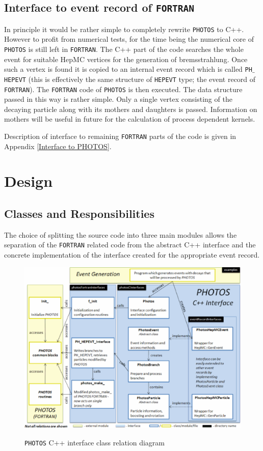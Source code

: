 \documentclass[]{Photos_interface_design}
\begin{document}
\subsection{Interface to event record of {\tt FORTRAN}}
\label{sect:F77fill}

In principle it would be rather simple to completely rewrite {\tt PHOTOS} to
C++. However to profit from numerical tests, for the time being the numerical core of {\tt PHOTOS}
is still left in {\tt FORTRAN}. The C++ part of the code searches the whole event for
suitable HepMC vertices for the generation of bremsstrahlung. Once such
a vertex is found it is copied to an internal event record  which is 
called  {\tt PH$\_$HEPEVT} (this is effectively the same structure of {\tt HEPEVT} type;
the event record of {\tt FORTRAN}).
The {\tt FORTRAN} code of {\tt PHOTOS} is then executed.
The data structure passed in this way is rather simple. Only a single vertex consisting
of the decaying particle along with its mothers and daughters is passed. Information 
on mothers will be useful in future for the calculation of process dependent 
kernels.



Description of interface to remaining {\tt FORTRAN} parts of the code is
given in  Appendix \ref{Interface to PHOTOS}.


\section{Design}
\label{sec:design}
\subsection{Classes and Responsibilities}

The choice of splitting the source code into three main modules
 allows the separation of the {\tt FORTRAN} related code from the abstract C++ interface
and the concrete implementation of the interface created for the appropriate
event record.

\begin{figure}[h!]
\centering
\includegraphics[scale=0.6]{interface_design.eps}
\label{fig:design}
\caption{{\tt PHOTOS} C++ interface class relation diagram}
\end{figure}
\end{document}

